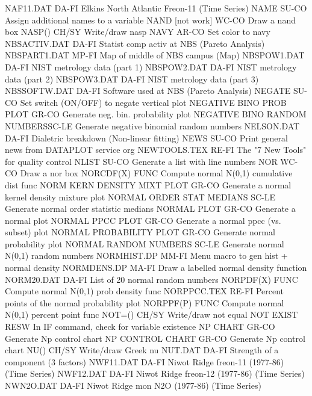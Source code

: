 NAF11.DAT                   DA-FI Elkins North Atlantic Freon-11 (Time Series)
NAME                        SU-CO Assign additional names to a variable
NAND       [not work]       WC-CO Draw a nand box
NASP()                      CH/SY Write/draw nasp
NAVY                        AR-CO Set color to navy
NBSACTIV.DAT                DA-FI Statist comp activ at NBS (Pareto Analysis)
NBSPART1.DAT                MP-FI Map of middle of NBS campus (Map)
NBSPOW1.DAT                 DA-FI NIST metrology data (part 1)
NBSPOW2.DAT                 DA-FI NIST metrology data (part 2)
NBSPOW3.DAT                 DA-FI NIST metrology data (part 3)
NBSSOFTW.DAT                DA-FI Software used at NBS (Pareto Analysis)
NEGATE                      SU-CO Set switch (ON/OFF) to negate vertical plot
NEGATIVE BINO PROB PLOT     GR-CO Generate neg. bin. probability plot
NEGATIVE BINO RANDOM NUMBERSSC-LE Generate negative binomial random numbers
NELSON.DAT                  DA-FI Dialetric breakdown (Non-linear fitting)
NEWS                        SU-CO Print general news from DATAPLOT service org
NEWTOOLS.TEX                RE-FI The "7 New Tools" for quality control
NLIST                       SU-CO Generate a list with line numbers
NOR                         WC-CO Draw a nor box
NORCDF(X)                   FUNC  Compute normal N(0,1) cumulative dist func
NORM KERN DENSITY MIXT PLOT GR-CO Generate a normal kernel density mixture plot
NORMAL ORDER STAT MEDIANS   SC-LE Generate normal order statistic medians
NORMAL PLOT                 GR-CO Generate a normal plot
NORMAL PPCC PLOT            GR-CO Generate a normal ppcc (vs. subset) plot
NORMAL PROBABILITY PLOT     GR-CO Generate normal probability plot
NORMAL RANDOM NUMBERS       SC-LE Generate normal N(0,1) random numbers
NORMHIST.DP                 MM-FI Menu macro to gen hist + normal density
NORMDENS.DP                 MA-FI Draw a labelled normal density function
NORM20.DAT                  DA-FI List of 20 normal random numbers
NORPDF(X)                   FUNC  Compute normal N(0,1) prob density func
NORPPCC.TEX                 RE-FI Percent points of the normal probability plot
NORPPF(P)                   FUNC  Compute normal N(0,1) percent point func
NOT=()                      CH/SY Write/draw not equal
NOT EXIST                   RESW  In IF command, check for variable existence
NP CHART                    GR-CO Generate Np control chart
NP CONTROL CHART            GR-CO Generate Np control chart
NU()                        CH/SY Write/draw Greek nu
NUT.DAT                     DA-FI Strength of a component (3 factors)
NWF11.DAT                   DA-FI Niwot Ridge freon-11 (1977-86) (Time Series)
NWF12.DAT                   DA-FI Niwot Ridge freon-12 (1977-86) (Time Series)
NWN2O.DAT                   DA-FI Niwot Ridge mon N2O (1977-86) (Time Series)

